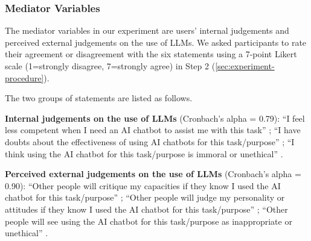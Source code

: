 \subsubsection{Mediator Variables}
The mediator variables in our experiment are users' internal judgements and perceived external judgements on the use of LLMs.
We asked participants to rate their agreement or disagreement with the six statements using a 7-point Likert scale (1=strongly disagree, 7=strongly agree) in Step 2 (\autoref{sec:experiment-procedure}).


The two groups of statements are listed as follows.

\textbf{Internal judgements on the use of LLMs} (Cronbach's alpha = 0.79):
``I feel less competent when I need an AI chatbot to assist me with this task'' ; ``I have doubts about the effectiveness of using AI chatbots for this task/purpose'' ; ``I think using the AI chatbot for this task/purpose is immoral or unethical'' .

\textbf{Perceived external judgements on the use of LLMs} (Cronbach's alpha = 0.90): 
``Other people will critique my capacities if they know I used the AI chatbot for this task/purpose'' ; ``Other people will judge my personality or attitudes if they know I used the AI chatbot for this task/purpose'' ; ``Other people will see using the AI chatbot for this task/purpose as inappropriate or unethical'' .




